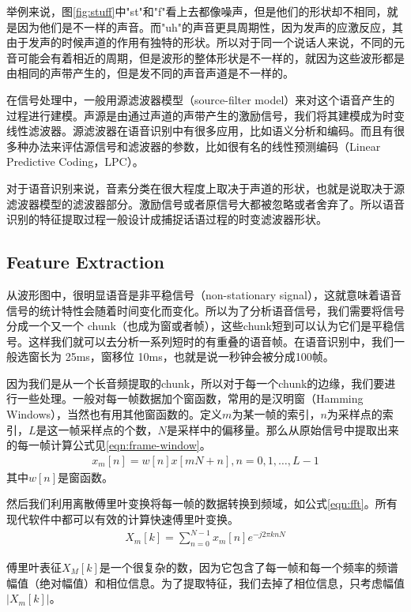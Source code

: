 举例来说，图\ref{fig:stuff}中"st"和"f"看上去都像噪声，但是他们的形状却不相同，就是因为他们是不一样的声音。而"uh"的声音更具周期性，因为发声的应激反应，其由于发声的时候声道的作用有独特的形状。所以对于同一个说话人来说，不同的元音可能会有着相近的周期，但是波形的整体形状是不一样的，就因为这些波形都是由相同的声带产生的，但是发不同的声音声道是不一样的。

在信号处理中，一般用源滤波器模型（source-filter model）来对这个语音产生的过程进行建模。声源是由通过声道的声带产生的激励信号，我们将其建模成为时变线性滤波器。源滤波器在语音识别中有很多应用，比如语义分析和编码。而且有很多种办法来评估源信号和滤波器的参数，比如很有名的线性预测编码（Linear Predictive Coding，LPC）。

对于语音识别来说，音素分类在很大程度上取决于声道的形状，也就是说取决于源滤波器模型的滤波器部分。激励信号或者原信号大都被忽略或者舍弃了。所以语音识别的特征提取过程一般设计成捕捉话语过程的时变滤波器形状。

\subsection{Feature Extraction} %
\label{sub:feature_extraction}
从波形图中，很明显语音是非平稳信号（non-stationary signal），这就意味着语音信号的统计特性会随着时间变化而变化。所以为了分析语音信号，我们需要将信号分成一个又一个 chunk（也成为窗或者帧），这些chunk短到可以认为它们是平稳信号。这样我们就可以去分析一系列短时的有重叠的语音帧。在语音识别中，我们一般选窗长为 25ms，窗移位 10ms，也就是说一秒钟会被分成100帧。

因为我们是从一个长音频提取的chunk，所以对于每一个chunk的边缘，我们要进行一些处理。一般对每一帧数据加个窗函数，常用的是汉明窗（Hamming Windows），当然也有用其他窗函数的。定义$m$为某一帧的索引，$n$为采样点的索引，$L$是这一帧采样点的个数，$N$是采样中的偏移量。那么从原始信号中提取出来的每一帧计算公式见\ref{eqn:frame-window}。
\begin{align}
\label{eqn:frame-window}
  x_{m}[n]=w[n] x[m N+n], n=0,1, \ldots, L-1
\end{align}
其中$w[n]$是窗函数。

然后我们利用离散傅里叶变换将每一帧的数据转换到频域，如公式\ref{eqn:fft}。所有现代软件中都可以有效的计算快速傅里叶变换。
\begin{align}
\label{eqn:fft}
  X_{m}[k]=\sum_{n=0}^{N-1} x_{m}[n] e^{-j 2 \pi k n N}
\end{align}

傅里叶表征$X_{M} [k]$是一个很复杂的数，因为它包含了每一帧和每一个频率的频谱幅值（绝对幅值）和相位信息。为了提取特征，我们去掉了相位信息，只考虑幅值 $|X_{m}[k]|$。

